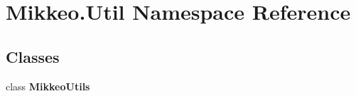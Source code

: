 \hypertarget{namespace_mikkeo_1_1_util}{}\section{Mikkeo.\+Util Namespace Reference}
\label{namespace_mikkeo_1_1_util}
\subsection*{Classes}
\begin{DoxyCompactItemize}
\item 
class {\bfseries Mikkeo\+Utils}
\end{DoxyCompactItemize}
